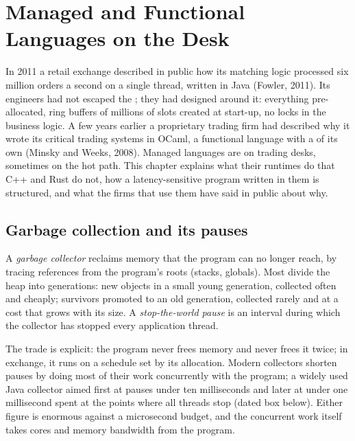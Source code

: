\chapter{Managed and Functional Languages on the Desk}\label{ch:ll:managed-and-functional-languages-on-the-desk}

In 2011 a retail exchange described in public how its matching logic processed six million orders a second on a single
thread, written in Java (Fowler, 2011). Its engineers had not escaped the ; they had designed around it:
everything pre-allocated, ring buffers of millions of slots created at start-up, no locks in the business logic. A few
years earlier a proprietary trading firm had described why it wrote its critical trading systems in OCaml, a functional
language with a  of its own (Minsky and Weeks, 2008). Managed languages are on trading desks, sometimes on
the hot path. This chapter explains what their runtimes do that C++ and Rust do not, how a latency-sensitive program
written in them is structured, and what the firms that use them have said in public about why.

\section{Garbage collection and its pauses}

\begin{definition}\label{def:ll:managed-and-functional-languages-on-the-desk:gc}
A \emph{garbage collector} reclaims memory that the program can no longer reach, by tracing
references from the program's roots (stacks, globals). Most divide the heap into generations: new objects in a small young
generation, collected often and cheaply; survivors promoted to an old generation, collected rarely and at a cost that grows
with its size. A \emph{stop-the-world pause} is an interval during which the collector has
stopped every application thread.
\end{definition}

The trade is explicit: the program never frees memory and never frees it twice; in exchange, it runs on a schedule set by
its allocation. Modern collectors shorten pauses by doing most of their work concurrently with the program; a widely used
Java collector aimed first at pauses under ten milliseconds and later at under one millisecond spent at the points where
all threads stop (dated box below). Either figure is enormous against a microsecond budget, and the concurrent work itself
takes cores and memory bandwidth from the program.

